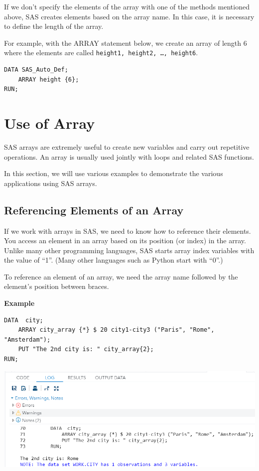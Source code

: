 \documentclass[
]{book}
\begin{document}
If we don't specify the elements of the array with one of the methods mentioned above, SAS creates elements based on the array name. In this case, it is necessary to define the length of the array.

For example, with the ARRAY statement below, we create an array of length 6 where the elements are called \texttt{height1,\ height2,\ …,\ height6}.

\begin{verbatim}
DATA SAS_Auto_Def;
    ARRAY height {6};
RUN;
\end{verbatim}

\hypertarget{use-of-array}{%
\section{Use of Array}\label{use-of-array}}

SAS arrays are extremely useful to create new variables and carry out repetitive operations. An array is usually used jointly with loops and related SAS functions.

In this section, we will use various examples to demonstrate the various applications using SAS arrays.

\hypertarget{referencing-elements-of-an-array}{%
\subsection{Referencing Elements of an Array}\label{referencing-elements-of-an-array}}

If we work with arrays in SAS, we need to know how to reference their elements. You access an element in an array based on its position (or index) in the array. Unlike many other programming languages, SAS starts array index variables with the value of ``1''. (Many other languages such as Python start with ``0''.)

To reference an element of an array, we need the array name followed by the element's position between braces.

\textbf{Example}

\begin{verbatim}
DATA  city;
    ARRAY city_array {*} $ 20 city1-city3 ("Paris", "Rome", "Amsterdam");
    PUT "The 2nd city is: " city_array{2};
RUN;
\end{verbatim}

\begin{center}\includegraphics[width=1\linewidth]{img11/w11-accessingArray} \end{center}
\end{document}

